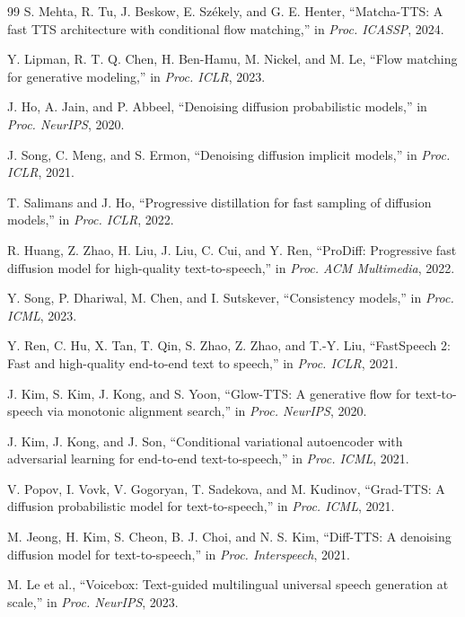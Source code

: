 \documentclass[10pt,twoside]{article}
\begin{document}
\begin{thebibliography}{99}
S. Mehta, R. Tu, J. Beskow, E. Sz\'ekely, and G. E. Henter, ``Matcha-TTS: A fast
TTS architecture with conditional flow matching,'' in \emph{Proc. ICASSP}, 2024.

Y. Lipman, R. T. Q. Chen, H. Ben-Hamu, M. Nickel, and M. Le, ``Flow matching
for generative modeling,'' in \emph{Proc. ICLR}, 2023.

J. Ho, A. Jain, and P. Abbeel, ``Denoising diffusion probabilistic models,'' in
\emph{Proc. NeurIPS}, 2020.

J. Song, C. Meng, and S. Ermon, ``Denoising diffusion implicit models,'' in
\emph{Proc. ICLR}, 2021.

T. Salimans and J. Ho, ``Progressive distillation for fast sampling of diffusion
models,'' in \emph{Proc. ICLR}, 2022.

R. Huang, Z. Zhao, H. Liu, J. Liu, C. Cui, and Y. Ren, ``ProDiff: Progressive
fast diffusion model for high-quality text-to-speech,'' in \emph{Proc. ACM
Multimedia}, 2022.

Y. Song, P. Dhariwal, M. Chen, and I. Sutskever, ``Consistency models,'' in
\emph{Proc. ICML}, 2023.

Y. Ren, C. Hu, X. Tan, T. Qin, S. Zhao, Z. Zhao, and T.-Y. Liu, ``FastSpeech 2:
Fast and high-quality end-to-end text to speech,'' in \emph{Proc. ICLR}, 2021.

J. Kim, S. Kim, J. Kong, and S. Yoon, ``Glow-TTS: A generative flow for
text-to-speech via monotonic alignment search,'' in \emph{Proc. NeurIPS}, 2020.

J. Kim, J. Kong, and J. Son, ``Conditional variational autoencoder with
adversarial learning for end-to-end text-to-speech,'' in \emph{Proc. ICML},
2021.

V. Popov, I. Vovk, V. Gogoryan, T. Sadekova, and M. Kudinov, ``Grad-TTS: A
diffusion probabilistic model for text-to-speech,'' in \emph{Proc. ICML}, 2021.

M. Jeong, H. Kim, S. Cheon, B. J. Choi, and N. S. Kim, ``Diff-TTS: A denoising
diffusion model for text-to-speech,'' in \emph{Proc. Interspeech}, 2021.

M. Le et al., ``Voicebox: Text-guided multilingual universal speech generation
at scale,'' in \emph{Proc. NeurIPS}, 2023.


\end{thebibliography}
\end{document}
